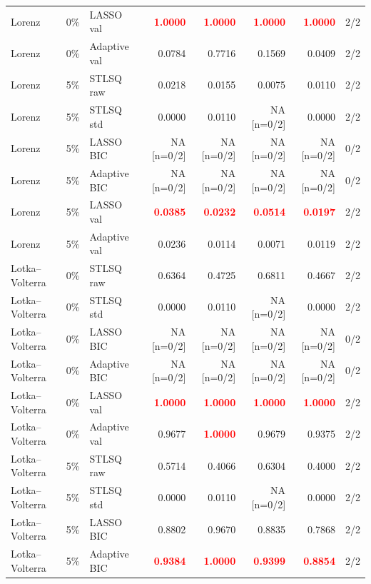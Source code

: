 \documentclass{article}
\begin{document}
\begin{longtable}{lllrrrrr}
Lorenz & 0\% & LASSO val & \textcolor{red}{\textbf{1.0000}} & \textcolor{red}{\textbf{1.0000}} & \textcolor{red}{\textbf{1.0000}} & \textcolor{red}{\textbf{1.0000}} & 2/2 \\
Lorenz & 0\% & Adaptive val & 0.0784 & 0.7716 & 0.1569 & 0.0409 & 2/2 \\
\midrule
Lorenz & 5\% & STLSQ raw & 0.0218 & 0.0155 & 0.0075 & 0.0110 & 2/2 \\
Lorenz & 5\% & STLSQ std & 0.0000 & 0.0110 & NA [n=0/2] & 0.0000 & 2/2 \\
Lorenz & 5\% & LASSO BIC & NA [n=0/2] & NA [n=0/2] & NA [n=0/2] & NA [n=0/2] & 0/2 \\
Lorenz & 5\% & Adaptive BIC & NA [n=0/2] & NA [n=0/2] & NA [n=0/2] & NA [n=0/2] & 0/2 \\
Lorenz & 5\% & LASSO val & \textcolor{red}{\textbf{0.0385}} & \textcolor{red}{\textbf{0.0232}} & \textcolor{red}{\textbf{0.0514}} & \textcolor{red}{\textbf{0.0197}} & 2/2 \\
Lorenz & 5\% & Adaptive val & 0.0236 & 0.0114 & 0.0071 & 0.0119 & 2/2 \\
\midrule
Lotka--Volterra & 0\% & STLSQ raw & 0.6364 & 0.4725 & 0.6811 & 0.4667 & 2/2 \\
Lotka--Volterra & 0\% & STLSQ std & 0.0000 & 0.0110 & NA [n=0/2] & 0.0000 & 2/2 \\
Lotka--Volterra & 0\% & LASSO BIC & NA [n=0/2] & NA [n=0/2] & NA [n=0/2] & NA [n=0/2] & 0/2 \\
Lotka--Volterra & 0\% & Adaptive BIC & NA [n=0/2] & NA [n=0/2] & NA [n=0/2] & NA [n=0/2] & 0/2 \\
Lotka--Volterra & 0\% & LASSO val & \textcolor{red}{\textbf{1.0000}} & \textcolor{red}{\textbf{1.0000}} & \textcolor{red}{\textbf{1.0000}} & \textcolor{red}{\textbf{1.0000}} & 2/2 \\
Lotka--Volterra & 0\% & Adaptive val & 0.9677 & \textcolor{red}{\textbf{1.0000}} & 0.9679 & 0.9375 & 2/2 \\
\midrule
Lotka--Volterra & 5\% & STLSQ raw & 0.5714 & 0.4066 & 0.6304 & 0.4000 & 2/2 \\
Lotka--Volterra & 5\% & STLSQ std & 0.0000 & 0.0110 & NA [n=0/2] & 0.0000 & 2/2 \\
Lotka--Volterra & 5\% & LASSO BIC & 0.8802 & 0.9670 & 0.8835 & 0.7868 & 2/2 \\
Lotka--Volterra & 5\% & Adaptive BIC & \textcolor{red}{\textbf{0.9384}} & \textcolor{red}{\textbf{1.0000}} & \textcolor{red}{\textbf{0.9399}} & \textcolor{red}{\textbf{0.8854}} & 2/2 \\

\end{longtable}
\end{document}
